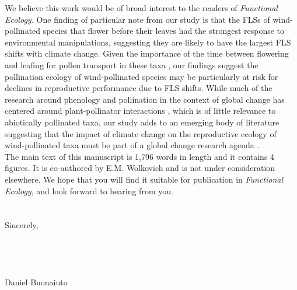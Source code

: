 \documentclass[11.75 pt]{article}\usepackage[]{graphicx}\usepackage[]{color}
\begin{document}
\noindent We believe this work would be of broad interest to the readers of \textit{Functional Ecology.} One finding of particular note from our study is that the FLSs of wind-pollinated species that flower before their leaves had the strongest response to environmental manipulations, suggesting they are likely to have the largest FLS shifts with climate change. Given the importance of the time between flowering and leafing for pollen transport in these taxa \citep{Friedman2009}, our findings suggest the pollination ecology of wind-pollinated species may be particularly at risk for declines in reproductive performance due to FLS shifts. While much of the research around phenology and pollination in the context of global change has centered around plant-pollinator interactions \citep{Memmott2007}, which is of little relevance to abiotically pollinated taxa, our study adds to an emerging body of literature suggesting that the impact of climate change on the reproductive ecology of wind-pollinated taxa must be part of a global change research agenda \citep{Kling:2020aa,Ziello:2012aa}.\\

\noindent The main text of this manuscript is 1,796 words in length and it contains 4 figures. It is co-authored by E.M. Wolkovich and is not under consideration elsewhere. We hope that you will find it suitable for publication in \textit{Functional Ecology}, and look forward to hearing from you.\\\\ %
\\Sincerely,\\\\\\\\\\

\noindent Daniel Buonaiuto\\

\pagebreak

 
\end{document}
